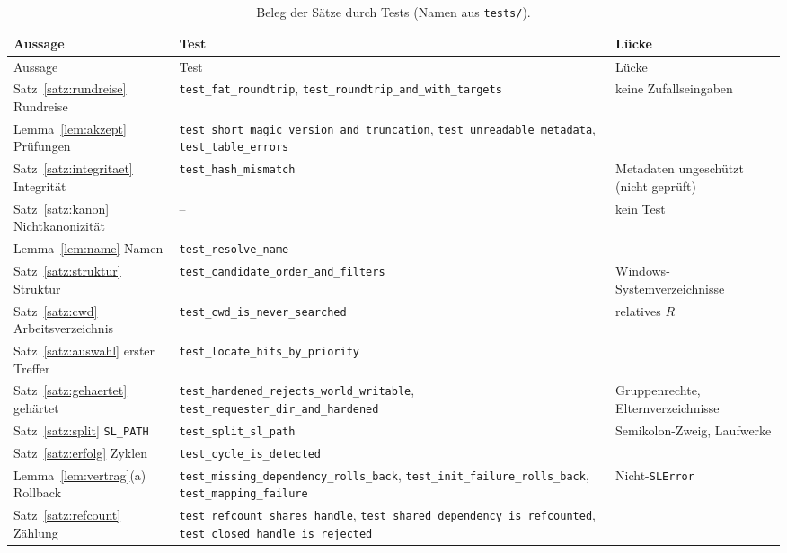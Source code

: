 {\small
\begin{longtable}{@{}L{4.3cm}L{6.5cm}L{3.4cm}@{}}
\caption{Beleg der Sätze durch Tests (Namen aus \texttt{tests/}).}\label{tab:testbeleg}\\
\toprule
Aussage & Test & Lücke \\
\midrule
\endfirsthead
\toprule
Aussage & Test & Lücke \\
\midrule
\endhead
\bottomrule
\endfoot
Satz~\ref{satz:rundreise} Rundreise & \texttt{test\_fat\_roundtrip}, \texttt{test\_roundtrip\_and\_with\_targets} & keine Zufallseingaben \\[0.3em]
Lemma~\ref{lem:akzept} Prüfungen & \texttt{test\_short\_magic\_version\_and\_truncation}, \texttt{test\_unreadable\_metadata}, \texttt{test\_table\_errors} & \\[0.3em]
Satz~\ref{satz:integritaet} Integrität & \texttt{test\_hash\_mismatch} & Metadaten ungeschützt (nicht geprüft) \\[0.3em]
Satz~\ref{satz:kanon} Nichtkanonizität & -- & kein Test \\[0.3em]
Lemma~\ref{lem:name} Namen & \texttt{test\_resolve\_name} & \\[0.3em]
Satz~\ref{satz:struktur} Struktur & \texttt{test\_candidate\_order\_and\_filters} & Windows-Systemverzeichnisse \\[0.3em]
Satz~\ref{satz:cwd} Arbeitsverzeichnis & \texttt{test\_cwd\_is\_never\_searched} & relatives $R$ \\[0.3em]
Satz~\ref{satz:auswahl} erster Treffer & \texttt{test\_locate\_hits\_by\_priority} & \\[0.3em]
Satz~\ref{satz:gehaertet} gehärtet & \texttt{test\_hardened\_rejects\_world\_writable}, \texttt{test\_requester\_dir\_and\_hardened} & Gruppenrechte, Elternverzeichnisse \\[0.3em]
Satz~\ref{satz:split} \texttt{SL\_PATH} & \texttt{test\_split\_sl\_path} & Semikolon-Zweig, Laufwerke \\[0.3em]
Satz~\ref{satz:erfolg} Zyklen & \texttt{test\_cycle\_is\_detected} & \\[0.3em]
Lemma~\ref{lem:vertrag}(a) Rollback & \texttt{test\_missing\_dependency\_rolls\_back}, \texttt{test\_init\_failure\_rolls\_back}, \texttt{test\_mapping\_failure} & Nicht-\texttt{SLError} \\[0.3em]
Satz~\ref{satz:refcount} Zählung & \texttt{test\_refcount\_shares\_handle}, \texttt{test\_shared\_dependency\_is\_refcounted}, \texttt{test\_closed\_handle\_is\_rejected} & \\[0.3em]

\end{longtable}}
